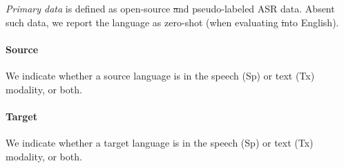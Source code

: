 \textit{Primary data} is defined as open-source \st and pseudo-labeled ASR data. Absent such data, we report the language as zero-shot (when evaluating \st into English).

\paragraph{Source}
We indicate whether a source language is in the speech (Sp) or text (Tx) modality, or both.

\paragraph{Target}
We indicate whether a target language is in the speech (Sp) or text (Tx) modality, or both.


